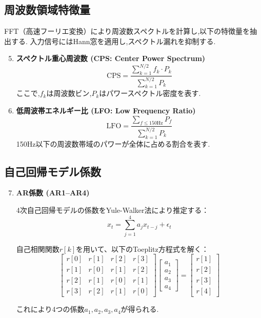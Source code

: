 \subsection*{周波数領域特徴量}

FFT（高速フーリエ変換）により周波数スペクトルを計算し,以下の特徴量を抽出する.
入力信号にはHann窓を適用し,スペクトル漏れを抑制する.

\begin{enumerate}
    \setcounter{enumi}{4}
    \item \textbf{スペクトル重心周波数 (CPS: Center Power Spectrum)}
    \begin{equation}
        \text{CPS} = \frac{\sum_{k=1}^{N/2} f_k \cdot P_k}{\sum_{k=1}^{N/2} P_k}
    \end{equation}
    ここで,\(f_k\)は周波数ビン,\(P_k\)はパワースペクトル密度を表す.
    
    \item \textbf{低周波帯エネルギー比 (LFO: Low Frequency Ratio)}
    \begin{equation}
        \text{LFO} = \frac{\sum_{f \leq 150\text{Hz}} P_f}{\sum_{k=1}^{N/2} P_k}
    \end{equation}
    150Hz以下の周波数帯域のパワーが全体に占める割合を表す.
\end{enumerate}

\subsection*{自己回帰モデル係数}

\begin{enumerate}
    \setcounter{enumi}{6}
    \item \textbf{AR係数 (AR1--AR4)}
    
    4次自己回帰モデルの係数をYule-Walker法により推定する：
    \begin{equation}
        x_t = \sum_{j=1}^{4} a_j x_{t-j} + \epsilon_t
    \end{equation}
    
    自己相関関数\(r[k]\)を用いて、以下のToeplitz方程式を解く：
    \begin{equation}
        \begin{bmatrix}
        r[0] & r[1] & r[2] & r[3] \\
        r[1] & r[0] & r[1] & r[2] \\
        r[2] & r[1] & r[0] & r[1] \\
        r[3] & r[2] & r[1] & r[0]
        \end{bmatrix}
        \begin{bmatrix}
        a_1 \\ a_2 \\ a_3 \\ a_4
        \end{bmatrix}
        =
        \begin{bmatrix}
        r[1] \\ r[2] \\ r[3] \\ r[4]
        \end{bmatrix}
    \end{equation}
    
    これにより4つの係数\(a_1, a_2, a_3, a_4\)が得られる.
\end{enumerate}
